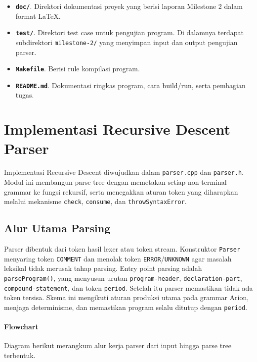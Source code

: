 \begin{itemize}
	\item \textbf{\texttt{doc/}}. Direktori dokumentasi proyek yang berisi laporan Milestone 2 dalam format LaTeX.

	\item \textbf{\texttt{test/}}. Direktori test case untuk pengujian program. Di dalamnya terdapat subdirektori \texttt{milestone-2/} yang menyimpan input dan output pengujian parser.

	\item \textbf{\texttt{Makefile}}. Berisi rule kompilasi program.

	\item \textbf{\texttt{README.md}}. Dokumentasi ringkas program, cara build/run, serta pembagian tugas.
\end{itemize}

\section{Implementasi Recursive Descent Parser}
Implementasi Recursive Descent diwujudkan dalam \texttt{parser.cpp} dan \texttt{parser.h}. Modul ini membangun parse tree dengan memetakan setiap non-terminal grammar ke fungsi rekursif, serta menegakkan aturan token yang diharapkan melalui mekanisme \texttt{check}, \texttt{consume}, dan \texttt{throwSyntaxError}.

\subsection{Alur Utama Parsing}
Parser dibentuk dari token hasil lexer atau token stream. Konstruktor \texttt{Parser} menyaring token \texttt{COMMENT} dan menolak token \texttt{ERROR}/\texttt{UNKNOWN} agar masalah leksikal tidak merusak tahap parsing. Entry point parsing adalah \texttt{parseProgram()}, yang menyusun urutan \texttt{program-header}, \texttt{declaration-part}, \texttt{compound-statement}, dan token \texttt{period}. Setelah itu parser memastikan tidak ada token tersisa. Skema ini mengikuti aturan produksi utama pada grammar Arion, menjaga determinisme, dan memastikan program selalu ditutup dengan \texttt{period}.

\paragraph{Flowchart}
Diagram berikut merangkum alur kerja parser dari input hingga parse tree terbentuk.


